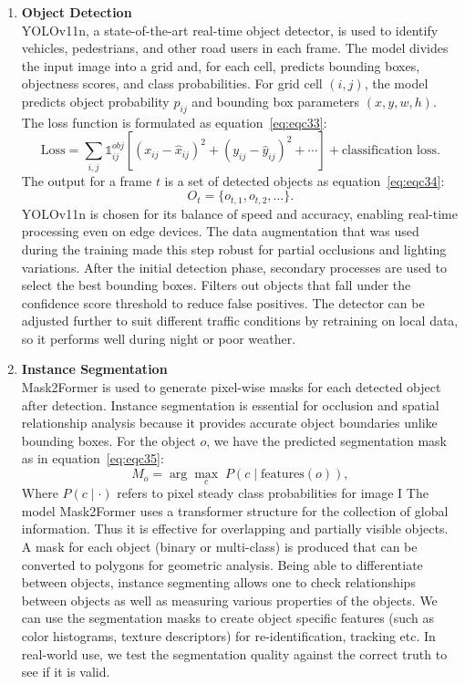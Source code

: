 \documentclass[12pt,a4paper]{report}
\theoremstyle{definition}
\theoremstyle{remark}
\begin{document}
\begin{enumerate}
    \item \textbf{Object Detection}\\
    YOLOv11n, a state-of-the-art real-time object detector, is used to identify vehicles, pedestrians, and other road users in each frame. The model divides the input image into a grid and, for each cell, predicts bounding boxes, objectness scores, and class probabilities. For grid cell $(i, j)$, the model predicts object probability $p_{ij}$ and bounding box parameters $(x, y, w, h)$. The loss function is formulated as equation~\ref{eq:eqc33}:
    \begin{equation}
    \label{eq:eqc33}
    \text{Loss} = \sum_{i,j} \mathbb{1}_{ij}^{obj} \left[(x_{ij} - \hat{x}_{ij})^2 + (y_{ij} - \hat{y}_{ij})^2 + \cdots \right] 
    + \text{classification loss}.
    \end{equation}
    The output for a frame $t$ is a set of detected objects as equation~\ref{eq:eqc34}:
    \begin{equation}
    \label{eq:eqc34}
    O_t = \{o_{t,1}, o_{t,2}, \ldots\}.
    \end{equation}
    YOLOv11n is chosen for its balance of speed and accuracy, enabling real-time processing even on edge devices. The data augmentation that was used during the training made this step robust for partial occlusions and lighting variations. After the initial detection phase, secondary processes are used to select the best bounding boxes.  Filters out objects that fall under the confidence score threshold to reduce false positives. The detector can be adjusted further to suit different traffic conditions by retraining on local data, so it performs well during night or poor weather.

    \item \textbf{Instance Segmentation}\\
    Mask2Former is used to generate pixel-wise masks for each detected object after detection. Instance segmentation is essential for occlusion and spatial relationship analysis because it provides accurate object boundaries unlike bounding boxes. For the object $o$, we have the predicted segmentation mask as in equation~\ref{eq:eqc35}:
    \begin{equation}
    \label{eq:eqc35}
    M_o = \arg\max_{c}\; P(c \mid \text{features}(o)),
    \end{equation}
    Where $P(c \mid \cdot)$ refers to pixel steady class probabilities for image I The model Mask2Former uses a transformer structure for the collection of global information. Thus it is effective for overlapping and partially visible objects. A mask for each object (binary or multi-class) is produced that can be converted to polygons for geometric analysis. Being able to differentiate between objects, instance segmenting allows one to check relationships between objects as well as measuring various properties of the objects. We can use the segmentation masks to create object specific features (such as color histograms, texture descriptors) for re-identification, tracking etc. In real-world use, we test the segmentation quality against the correct truth to see if it is valid.


\end{enumerate}
\end{document}
